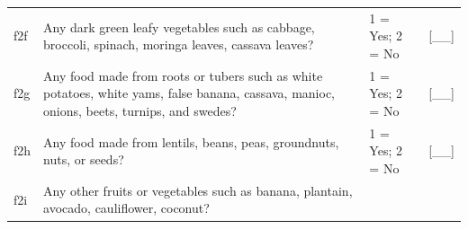 \documentclass[12pt,a4paper]{book}
\theoremstyle{definition}
\theoremstyle{definition}
\theoremstyle{definition}
\theoremstyle{remark}
\begin{document}
\begin{longtable}[]{@{}llll@{}}
\begin{minipage}[t]{0.09\columnwidth}
f2f\strut
\end{minipage} & \begin{minipage}[t]{0.41\columnwidth}\raggedright
Any dark green leafy vegetables such as cabbage, broccoli, spinach,
moringa leaves, cassava leaves?\strut
\end{minipage} & \begin{minipage}[t]{0.25\columnwidth}\raggedright
1 = Yes; 2 = No\strut
\end{minipage} & \begin{minipage}[t]{0.13\columnwidth}\raggedright
{[}\_\_{]}\strut
\end{minipage}\tabularnewline
\begin{minipage}[t]{0.09\columnwidth}\raggedright
f2g\strut
\end{minipage} & \begin{minipage}[t]{0.41\columnwidth}\raggedright
Any food made from roots or tubers such as white potatoes, white yams,
false banana, cassava, manioc, onions, beets, turnips, and swedes?\strut
\end{minipage} & \begin{minipage}[t]{0.25\columnwidth}\raggedright
1 = Yes; 2 = No\strut
\end{minipage} & \begin{minipage}[t]{0.13\columnwidth}\raggedright
{[}\_\_{]}\strut
\end{minipage}\tabularnewline
\begin{minipage}[t]{0.09\columnwidth}\raggedright
f2h\strut
\end{minipage} & \begin{minipage}[t]{0.41\columnwidth}\raggedright
Any food made from lentils, beans, peas, groundnuts, nuts, or
seeds?\strut
\end{minipage} & \begin{minipage}[t]{0.25\columnwidth}\raggedright
1 = Yes; 2 = No\strut
\end{minipage} & \begin{minipage}[t]{0.13\columnwidth}\raggedright
{[}\_\_{]}\strut
\end{minipage}\tabularnewline
\begin{minipage}[t]{0.09\columnwidth}\raggedright
f2i\strut
\end{minipage} & \begin{minipage}[t]{0.41\columnwidth}\raggedright
Any other fruits or vegetables such as banana, plantain, avocado,
cauliflower, coconut?\strut
\end{minipage} & \begin{minipage}[t]{0.25\columnwidth}\raggedright

\end{minipage}
\end{longtable}
\end{document}
